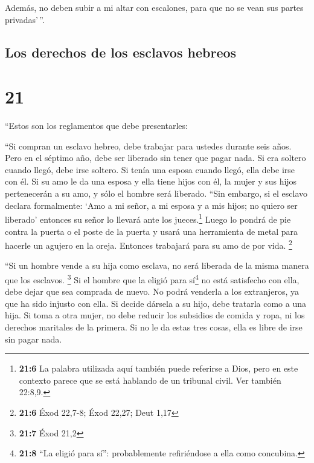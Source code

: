 Además, no deben subir a mi altar con escalones, para
que no se vean sus partes privadas'\,''.

\hypertarget{los-derechos-de-los-esclavos-hebreos}{%
\subsection{Los derechos de los esclavos
hebreos}\label{los-derechos-de-los-esclavos-hebreos}}

\hypertarget{section-20}{%
\section{21}\label{section-20}}

 ``Estos son los reglamentos que debe presentarles:

 ``Si compran un esclavo hebreo, debe trabajar para
ustedes durante seis años. Pero en el séptimo año, debe ser liberado sin
tener que pagar nada.  Si era soltero cuando llegó, debe
irse soltero. Si tenía una esposa cuando llegó, ella debe irse con él.
 Si su amo le da una esposa y ella tiene hijos con él, la
mujer y sus hijos pertenecerán a su amo, y sólo el hombre será liberado.
 ``Sin embargo, si el esclavo declara formalmente: `Amo a
mi señor, a mi esposa y a mis hijos; no quiero ser liberado'
 entonces su señor lo llevará ante los jueces.\footnote{\textbf{21:6}
  La palabra utilizada aquí también puede referirse a Dios, pero en este
  contexto parece que se está hablando de un tribunal civil. Ver también
  22:8,9.} Luego lo pondrá de pie contra la puerta o el poste de la
puerta y usará una herramienta de metal para hacerle un agujero en la
oreja. Entonces trabajará para su amo de por vida. \footnote{\textbf{21:6}
  Éxod 22,7-8; Éxod 22,27; Deut 1,17}

 ``Si un hombre vende a su hija como esclava, no será
liberada de la misma manera que los esclavos. \footnote{\textbf{21:7}
  Éxod 21,2}  Si el hombre que la eligió para
sí\footnote{\textbf{21:8} ``La eligió para sí'': probablemente
  refiriéndose a ella como concubina.} no está satisfecho con ella, debe
dejar que sea comprada de nuevo. No podrá venderla a los extranjeros, ya
que ha sido injusto con ella.  Si decide dársela a su
hijo, debe tratarla como a una hija.  Si toma a otra
mujer, no debe reducir los subsidios de comida y ropa, ni los derechos
maritales de la primera.  Si no le da estas tres cosas,
ella es libre de irse sin pagar nada.

